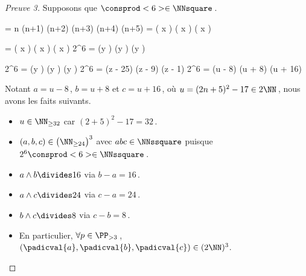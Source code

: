 \begin{proof}[Preuve 3]%
    Supposons que $\consprod<6> \in \NNsquare$\,.

    \medskip
    \begin{stepcalc}[style = ar*, ope = \iff]
    	 = 
			n (n+1) (n+2) (n+3) (n+4) (n+5)
    	\consprod<6> = 
			\big( x \pm {} \big) \big( x \pm {} \big) \big( x \pm {} \big)
    \end{stepcalc}

    \begin{stepcalc}[style = ar*, ope = \iff]
    	 = 
			\big( x \pm {} \big) \big( x \pm {} \big) \big( x \pm {} \big)
    	2^6 \consprod<6> = 
			(y ) (y ) (y )
    \end{stepcalc}
    
    \begin{stepcalc}[style = ar*, ope = \iff]
    	2^6 \consprod<6> = 
			(y ) (y ) (y )
    	2^6 \consprod<6> = 
			(z - 25) (z - 9) (z - 1) 
    	2^6 \consprod<6> = 
			(u - 8) (u + 8) (u + 16)
    \end{stepcalc}

    \medskip
    Notant $a = u - 8$\,, $b = u + 8$ et $c = u + 16$\,, où $u = (2 n + 5)^2 - 17 \in 2 \NN$\,, nous avons les faits suivants.
    
    \begin{itemize}
		\item $u \in \NN_{\geq 32}$ car $(2 + 5)^2 - 17 = 32$\,.

		\item $(a, b, c) \in \big( \NN_{\geq 24} \big)^3$ avec $abc \in \NNssquare$ puisque $2^6 \consprod<6> \in \NNssquare$\,.

		\item $a \wedge b \divides 16$ via $b - a = 16$\,.

		\item $a \wedge c \divides 24$ via $c - a = 24$\,.

		\item $b \wedge c \divides 8$  via $c - b = 8$\,.

		\item En particulier, 
		$\forall p \in \PP_{>3}$\,, 
		$(\padicval{a}, \padicval{b}, \padicval{c}) \in ( 2 \NN )^3$.
	\end{itemize}


\end{proof}

